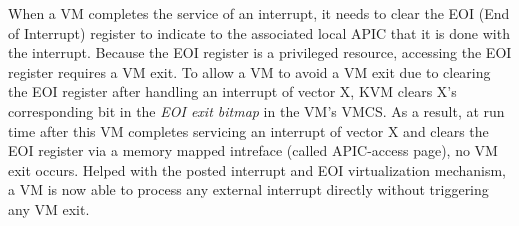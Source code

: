 When a VM completes the service of an interrupt, it needs to clear the EOI (End of Interrupt) register to indicate to the 
associated local APIC that it is done with the interrupt. Because the EOI register is a privileged resource, accessing the EOI register
requires a VM exit. To allow a VM to avoid a VM exit due to clearing the EOI register after handling an interrupt of vector X,  KVM clears X's corresponding bit in 
the {\em EOI exit bitmap} in the VM's VMCS. As a result, at run time after this VM completes servicing an interrupt of vector X and clears the EOI register via a memory mapped 
intreface (called APIC-access page), no VM exit occurs.   
Helped with the posted interrupt and EOI virtualization mechanism, a VM is now able to process any external interrupt directly without triggering any VM exit.



 

